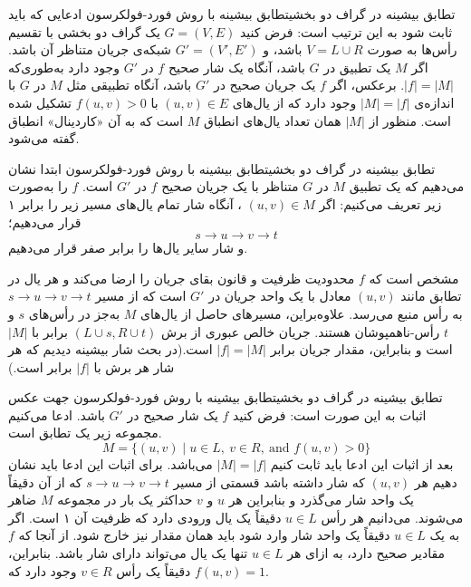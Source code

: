 \begin{itemframe-s}{تطابق بیشینه در گراف دو بخشی}{تطابق بیشینه با روش فورد-فولکرسون}
\itm
ادعایی که باید ثابت شود به این ترتیب است:
\itm
فرض کنید $G = (V, E)$ یک گراف دو بخشی با تقسیم رأس‌ها به صورت $V = L \cup R$ باشد، و $G' = (V', E')$ شبکه‌ی جریان متناظر آن باشد. اگر $M$ یک تطبیق در $G$ باشد، آنگاه یک شار صحیح $f$ در $G'$ وجود دارد به‌طوری‌که $|f| = |M|$.
\itm
 برعکس، اگر $f$ یک جریان صحیح در $G'$ باشد، آنگاه تطبیقی مثل $M$ در $G$ با اندازه‌ی
$|M| = |f|$
وجود دارد که از یال‌های $(u, v) \in E$ با
 $f(u, v) > 0$
 تشکیل شده است.
\itm
منظور از $|M|$ همان تعداد یال‌های انطباق $M$ است که به آن «کاردینال»
 انطباق گفته می‌شود.
\end{itemframe-s}

\begin{itemframe-s}{تطابق بیشینه در گراف دو بخشی}{تطابق بیشینه با روش فورد-فولکرسون}
\itm
ابتدا نشان می‌دهیم که یک تطبیق $M$ در $G$ متناظر با یک جریان صحیح $f$ در $G'$ است. $f$ را به‌صورت زیر تعریف می‌کنیم:
\itm
اگر
$(u, v) \in M$
، آنگاه شار تمام یال‌های مسیر زیر را برابر ۱ قرار می‌دهیم؛
$$s \to u \to v \to t$$
 و شار سایر یال‌ها را برابر صفر قرار می‌دهیم.
\itm

مشخص است که $f$ محدودیت ظرفیت و قانون بقای جریان را ارضا می‌کند و هر یال در تطابق مانند
$(u, v)$
معادل با یک واحد جریان در $G'$ است که از مسیر
$s \to u \to v \to t$
به رأس منبع می‌رسد. علاوه‌براین، مسیرهای حاصل از یال‌های $M$ به‌جز در رأس‌های $s$ و $t$ رأس‌-ناهمپوشان هستند.
\itm
 جریان خالص عبوری از برش
$(L \cup {s}, R \cup {t})$
برابر با $|M|$ است و بنابراین، مقدار جریان برابر
 $|f| = |M|$
 است.(در بحث شار بیشینه دیدیم که هر شار هر برش با $|f|$ برابر است.)
\end{itemframe-s}

\begin{itemframe-s}{تطابق بیشینه در گراف دو بخشی}{تطابق بیشینه با روش فورد-فولکرسون}
\itm
جهت عکس اثبات به این صورت است:
فرض کنید $f$ یک شار صحیح در $G'$ باشد. ادعا می‌کنیم مجموعه زیر یک تطابق است.
$$
M = \{ (u, v) \mid u \in L,\ v \in R,\ \text{and } f(u,v) > 0 \}
$$
بعد از اثبات این ادعا باید ثابت کنیم $|M| = |f|$ می‌باشد.
\itm
برای اثبات این ادعا باید نشان دهیم هر
$ (u, v) $
که شار داشته باشد قسمتی از مسیر
$s \to u \to v \to t$
که از آن دقیقاً یک واحد شار می‌گذرد و بنابراین هر $u$ و $v$ حداکثر یک بار در مجموعه $M$ ضاهر می‌شوند.
\itm
می‌دانیم هر رأس
 $u \in L$
دقیقاً یک یال ورودی دارد که ظرفیت آن ۱ است.
اگر به یک  $u \in L$  دقیقاً یک واحد شار وارد شود باید همان مقدار نیز خارج شود.
از آنجا که $f$ مقادیر صحیح دارد، به ازای هر $u \in L$ تنها یک یال می‌تواند دارای شار باشد. بنابراین، دقیقاً یک رأس $v \in R$ وجود دارد که
$f(u, v) = 1$.

\end{itemframe-s}

